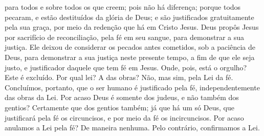 { para todos e sobre todos os que creem; pois não há diferença;
porque todos pecaram, e estão destituídos da glória de Deus;
e são justificados gratuitamente pela sua graça, por meio da redenção
 que há em Cristo Jesus.
Deus propôs Jesus
 por sacrifício de reconciliação, pela fé em seu sangue, para demonstrar a sua justiça. Ele deixou de considerar os pecados antes cometidos, sob a paciência de Deus,
para demonstrar a sua justiça neste presente tempo, a fim de que ele seja justo, e justificador daquele que tem fé em Jesus.
Onde, pois, está o orgulho? Este é excluído. Por qual lei? A das obras? Não, mas sim, pela Lei da fé.
Concluímos, portanto, que o ser humano é justificado pela fé, independentemente das obras da Lei.
Por acaso Deus é somente dos judeus, e não também dos gentios? Certamente que dos gentios também;
já que há um só Deus, que justificará pela fé os circuncisos, e por meio da fé os incircuncisos.
Por acaso anulamos a Lei pela fé? De maneira nenhuma. Pelo contrário, confirmamos a Lei.

}
